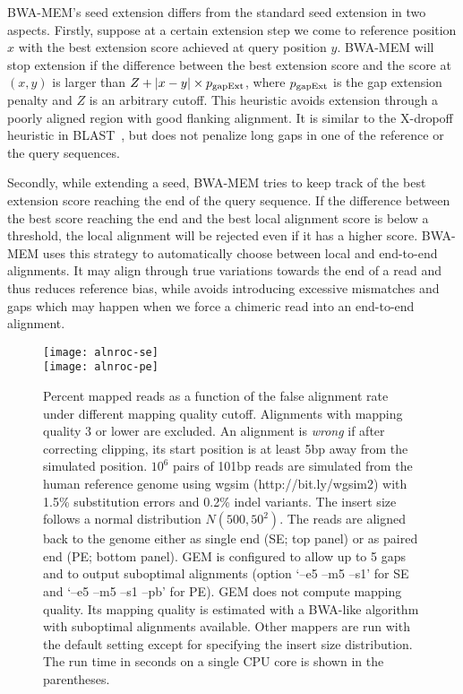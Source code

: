 \documentclass{bioinfo}
\begin{document}
\begin{methods}
BWA-MEM's seed extension differs from the standard seed extension in two
aspects. Firstly, suppose at a certain extension step we come to reference
position $x$ with the best extension score achieved at query position $y$.
BWA-MEM will stop extension if the difference between the best extension score
and the score at $(x,y)$ is larger than $Z+|x-y|\times p_{\rm gapExt}$, where
$p_{\rm gapExt}$ is the gap extension penalty and $Z$ is an arbitrary cutoff.
This heuristic avoids extension through a poorly aligned region with good
flanking alignment. It is similar to the X-dropoff heuristic in
BLAST~\citep{Altschul:1997vn}, but does not penalize long gaps in one of the
reference or the query sequences.

Secondly, while extending a seed, BWA-MEM tries to keep track of the best
extension score reaching the end of the query sequence. If the difference
between the best score reaching the end and the best local alignment score is
below a threshold, the local alignment will be rejected even if it has a higher
score. BWA-MEM uses this strategy to automatically choose between local and
end-to-end alignments. It may align through true variations towards the end of
a read and thus reduces reference bias, while avoids introducing excessive
mismatches and gaps which may happen when we force a chimeric read into an
end-to-end alignment.

\begin{figure}[tb]
\centering
\texttt{[image: alnroc-se]}\\
\texttt{[image: alnroc-pe]}
\caption{Percent mapped reads as a function of the false alignment rate under
different mapping quality cutoff. Alignments with mapping quality 3 or lower
are excluded. An alignment is \emph{wrong} if after correcting clipping, its
start position is at least 5bp away from the simulated position. $10^6$ pairs
of 101bp reads are simulated from the human reference genome using wgsim
(http://bit.ly/wgsim2) with 1.5\% substitution errors and 0.2\% indel variants.
The insert size follows a normal distribution $N(500,50^2)$. The reads are
aligned back to the genome either as single end (SE; top panel) or as paired
end (PE; bottom panel). GEM is configured to allow up to 5 gaps and to output
suboptimal alignments (option `--e5 --m5 --s1' for SE and `--e5 --m5 --s1 --pb'
for PE). GEM does not compute mapping quality. Its mapping quality is estimated
with a BWA-like algorithm with suboptimal
alignments available.  Other mappers are run with the default setting except
for specifying the insert size distribution. The run time in seconds on a
single CPU core is shown in the parentheses.}\label{fig:eval}
\end{figure}


\end{methods}
\end{document}
